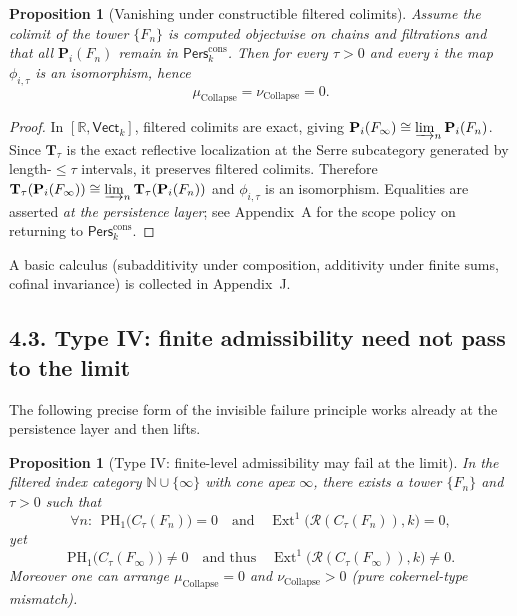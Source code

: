 \documentclass[11pt]{article}
\DeclareMathOperator{\Ext}{Ext}
\newcommand{\Pers}{\mathsf{Pers}}
\numberwithin{equation}{section}
\newtheorem{proposition}[theorem]{Proposition}
\theoremstyle{definition}
\DeclareRobustCommand{\muc}{\mu_{\mathrm{Collapse}}}
\DeclareRobustCommand{\nuc}{\nu_{\mathrm{Collapse}}}
\begin{document}
\begin{proposition}[Vanishing under constructible filtered colimits]\label{prop:mu-vanishing}
Assume the colimit of the tower $\{F_n\}$ is computed \emph{objectwise on chains and filtrations} and that all $\mathbf{P}_i(F_n)$ remain in $\Pers^{\mathrm{cons}}_k$. Then for every $\tau>0$ and every $i$ the map $\phi_{i,\tau}$ is an isomorphism, hence
\[
\muc=\nuc=0.
\]
\end{proposition}

\begin{proof}
In $[\mathbb{R},\mathsf{Vect}_k]$, filtered colimits are exact, giving $\mathbf{P}_i(F_\infty)\cong \varinjlim_n \mathbf{P}_i(F_n)$. Since $\mathbf{T}_\tau$ is the exact reflective localization at the Serre subcategory generated by length-$\le\tau$ intervals, it preserves filtered colimits. Therefore $\mathbf{T}_\tau(\mathbf{P}_i(F_\infty))\cong \varinjlim_n \mathbf{T}_\tau(\mathbf{P}_i(F_n))$ and $\phi_{i,\tau}$ is an isomorphism. Equalities are asserted \emph{at the persistence layer}; see Appendix~A for the scope policy on returning to $\Pers^{\mathrm{cons}}_k$.
\end{proof}

\noindent A basic calculus (subadditivity under composition, additivity under finite sums, cofinal invariance) is collected in Appendix~J.

\subsection*{4.3. Type IV: finite admissibility need not pass to the limit}
The following precise form of the invisible failure principle works already at the persistence layer and then lifts.

\begin{proposition}[Type IV: finite-level admissibility may fail at the limit]\label{prop:type4}
In the filtered index category $\mathbb{N}\cup\{\infty\}$ with cone apex $\infty$, there exists a tower $\{F_n\}$ and $\tau>0$ such that
\[
\forall n:\ \ \mathrm{PH}_1\!\big(C_\tau(F_n)\big)=0\quad\text{and}\quad \Ext^1\!\big(\mathcal{R}(C_\tau(F_n)),k\big)=0,
\]
yet
\[
\mathrm{PH}_1\!\big(C_\tau(F_\infty)\big)\neq 0\quad\text{and thus}\quad \Ext^1\!\big(\mathcal{R}(C_\tau(F_\infty)),k\big)\neq 0.
\]
Moreover one can arrange $\muc=0$ and $\nuc>0$ (pure cokernel-type mismatch).
\end{proposition}
\end{document}
